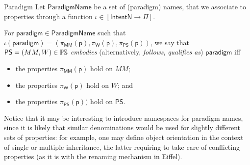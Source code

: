 \begin{Definition}{\label{def:Paradigm}Paradigm}
Let $\mathsf{ParadigmName}$ be a set of (paradigm) names, that we associate to 
properties through a function $\iota \in [\mathsf{IntentN} \to \Pi]$.

For $\mathsf{paradigm}\in\mathsf{ParadigmName}$ such that 
$\iota(\mathsf{paradigm}) = (\pi_{\mathsf{MM}}(\mathsf{p}),                     
 \pi_{\mathsf{W}}(\mathsf{p}),                      
\pi_{\mathsf{PS}}(\mathsf{p}))$, 
we say that $\mathsf{PS} = (MM, W)\in\mathbb{P}\mskip-1mu\mathbb{S}$ \emph{embodies} (alternatively, 
\emph{follows}, \emph{qualifies as}) $\mathsf{paradigm}$ iff
\begin{itemize}
   \item the properties $\pi_{\mathsf{MM}}(\mathsf{p})$ hold on $MM$;
   \item the properties $\pi_{\mathsf{W}}(\mathsf{p})$ hold on $W$; and
   \item the properties $ \pi_{\mathsf{PS}}(\mathsf{p}))$ hold on $\mathsf{PS}$.
\end{itemize}
\end{Definition}
Notice that it may be interesting to introduce namespaces for paradigm names, 
since it is likely that similar denominations would be used for slightly 
different sets of properties: for example, one may define object orientation in 
the context of single or multiple inheritance, the latter requiring to take 
care of conflicting properties (as it is with the renaming mechanism in Eiffel).

